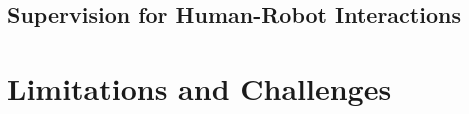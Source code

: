 \documentclass[a4paper,11pt,twoside]{StyleThese}
\begin{document}
\subsection{Supervision for Human-Robot Interactions}

\section{Limitations and Challenges}




\ifdefined{}
\else


\end{document}
